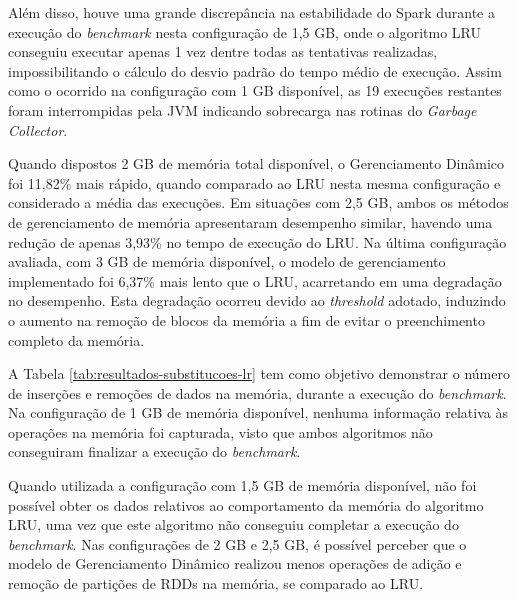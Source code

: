 Além disso, houve uma grande discrepância na estabilidade do Spark durante a execução do \textit{benchmark} nesta configuração de 1,5 GB, onde o algoritmo LRU conseguiu executar apenas 1 vez dentre todas as tentativas realizadas, impossibilitando o cálculo do desvio padrão do tempo médio de execução. Assim como o ocorrido na configuração com 1 GB disponível, as 19 execuções restantes foram interrompidas pela JVM indicando sobrecarga nas rotinas do \textit{Garbage Collector}.

Quando dispostos 2 GB de memória total disponível, o Gerenciamento Dinâmico foi 11,82\% mais rápido, quando comparado ao LRU nesta mesma configuração e considerado a média das execuções. Em situações com 2,5 GB, ambos os métodos de gerenciamento de memória apresentaram desempenho similar, havendo uma redução de apenas 3,93\% no tempo de execução do LRU. Na última configuração avaliada, com 3 GB de memória disponível, o modelo de gerenciamento implementado foi 6,37\% mais lento que o LRU, acarretando em uma degradação no desempenho. Esta degradação ocorreu devido ao \textit{threshold} adotado, induzindo o aumento na remoção de blocos da memória a fim de evitar o preenchimento completo da memória.

A Tabela \ref{tab:resultados-substitucoes-lr} tem como objetivo demonstrar o número de inserções e remoções de dados na memória, durante a execução do \textit{benchmark}. Na configuração de 1 GB de memória disponível, nenhuma informação relativa às operações na memória foi capturada, visto que ambos algoritmos não conseguiram finalizar a execução do \textit{benchmark}.

Quando utilizada a configuração com 1,5 GB de memória disponível, não foi possível obter os dados relativos ao comportamento da memória do algoritmo LRU, uma vez que este algoritmo não conseguiu completar a execução do \textit{benchmark}. Nas configurações de 2 GB e 2,5 GB, é possível perceber que o modelo de Gerenciamento Dinâmico realizou menos operações de adição e remoção de partições de RDDs na memória, se comparado ao LRU. 

